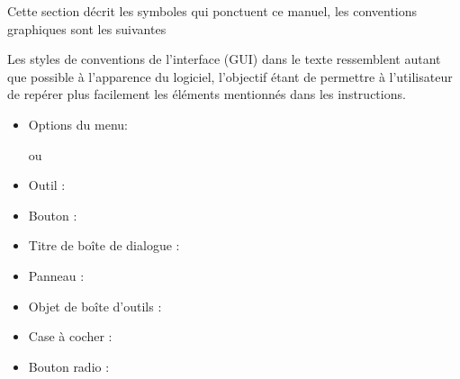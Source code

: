 \newpage
{}\label{label_conventions}

Cette section décrit les symboles qui ponctuent ce manuel, les conventions graphiques sont les suivantes


Les styles de conventions de l'interface (GUI) dans le texte ressemblent autant que possible à l'apparence du logiciel, l'objectif étant de permettre à l'utilisateur de repérer plus facilement les éléments mentionnés dans les instructions.

\begin{itemize}[label=--,itemsep=5pt]
\item Options du menu:  \fleche %

ou

 \fleche %
 \fleche {}
\item Outil : 
\item Bouton : 
\item Titre de boîte de dialogue : 
\item Panneau : 

% 
% 
% 
% 
% 
\item Objet de boîte d'outils :  
\item Case à cocher : 
\item Bouton radio :   





\end{itemize}

